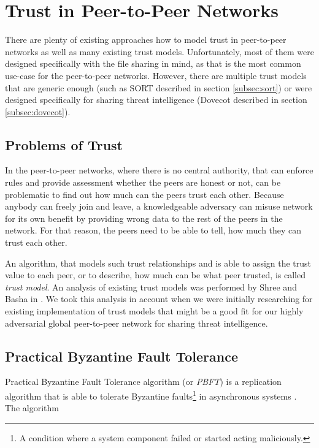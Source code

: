 \section{Trust in Peer-to-Peer Networks}
\label{sec:trust-in-p2p}

There are plenty of existing approaches how to model trust in peer-to-peer networks as well as many existing trust models.
Unfortunately, most of them were designed specifically with the file sharing in mind, as that is the most common use-case for the peer-to-peer networks.
However, there are multiple trust models that are generic enough (such as SORT described in section \ref{subsec:sort}) or were designed specifically for sharing threat intelligence (Dovecot described in section \ref{subsec:dovecot}).

\subsection{Problems of Trust}
\label{subsec:problems-of-trust}
In the peer-to-peer networks, where there is no central authority, that can enforce rules and provide assessment whether the peers are honest or not, can be problematic to find out how much can the peers trust each other.
Because anybody can freely join and leave, a knowledgeable adversary can misuse network for its own benefit by providing wrong data to the rest of the peers in the network.
For that reason, the peers need to be able to tell, how much they can trust each other. 

An algorithm, that models such trust relationships and is able to assign the trust value to each peer, or to describe, how much can be what peer trusted, is called \textit{trust model}.
An analysis of existing trust models was performed by Shree and Basha in \cite{shree2014exhaustive}. 
We took this analysis in account when we were initially researching for existing implementation of trust models that might be a good fit for our highly adversarial global peer-to-peer network for sharing threat intelligence.

\subsection{Practical Byzantine Fault Tolerance}
\label{subsec:pbft}
Practical Byzantine Fault Tolerance algorithm (or \textit{PBFT}) is a replication algorithm that is able to tolerate Byzantine faults\footnote{A condition where a system component failed or started acting maliciously.} in asynchronous systems \cite{castro1999practical}.
The algorithm 

